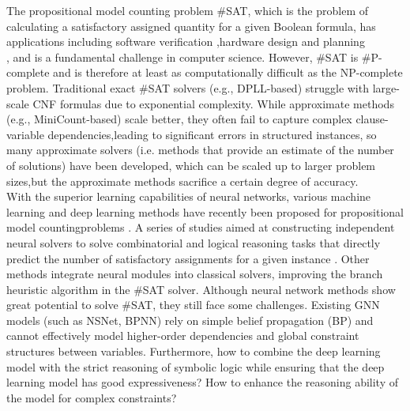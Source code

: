 The propositional model counting problem \#SAT, which is the problem of calculating a satisfactory 
assigned quantity for a given Boolean formula, has applications including software verification
\cite{DBLP:journals/fmsd/ClarkeBRZ01}\cite{DBLP:journals/tcs/IvancicYGGA08},hardware design and 
planning\cite{DBLP:conf/dac/SilvaS00}\cite{DBLP:conf/fmcad/SheeranSS00}\\ \cite{DBLP:conf/aips/DomshlakH06}, 
and is a fundamental challenge in computer science. However, \#SAT is \#P-complete and is therefore 
at least as computationally difficult as the NP-complete problem. Traditional exact \#SAT solvers 
(e.g., DPLL-based)\cite{DBLP:journals/tfs/Guller18}\cite{DBLP:journals/jacm/NieuwenhuisOT06} struggle 
with large-scale CNF formulas due to exponential complexity. While approximate methods 
(e.g., MiniCount-based)\cite{DBLP:journals/anor/KrocSS11} scale better, they often fail to capture 
complex clause-variable dependencies,leading to significant errors in structured instances, so many 
approximate solvers (i.e. methods that provide an estimate of the number of solutions) have been 
developed, which can be scaled up to larger problem sizes,but the approximate methods sacrifice a 
certain degree of accuracy.\\

With the superior learning capabilities of neural networks, various machine learning and deep learning 
methods have recently been proposed for propositional model countingproblems\cite{DBLP:conf/aaai/VaezipoorLWMGSB21}
\cite{Atkari_2019_10}\cite{DBLP:conf/ijcnn/OzolinsFDGZK22}. A series of studies aimed at constructing 
independent neural solvers to solve combinatorial and logical reasoning tasks that directly predict
the number of satisfactory assignments for a given instance\cite{DBLP:conf/iclr/AmizadehMW19}
\cite{DBLP:journals/corr/abs-1903-01969}. Other methods integrate neural modules into classical solvers, 
improving the branch heuristic algorithm in the \#SAT solver\cite{DBLP:conf/aaai/VaezipoorLWMGSB21}.
Although neural network methods show great potential to solve \#SAT, they still face some challenges. 
Existing GNN models (such as NSNet\cite{DBLP:conf/nips/LiS22}, BPNN\cite{DBLP:conf/nips/KuckCTLSSE20}) 
rely on simple belief propagation (BP) and cannot effectively model higher-order dependencies and global 
constraint structures between variables. Furthermore, how to combine the deep learning model with the 
strict reasoning of symbolic logic while ensuring that the deep learning model has good expressiveness?
\cite{DBLP:journals/tkde/WuLL24} How to enhance the reasoning ability of the model for complex 
constraints?\cite{DBLP:journals/pami/ChenJYZ22}\\

